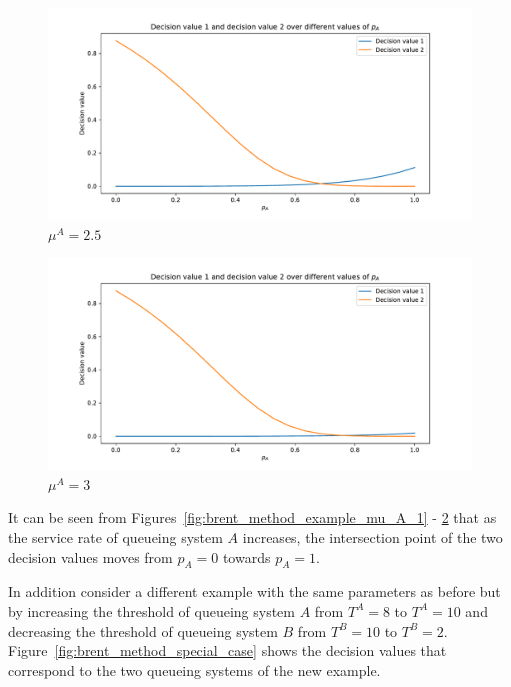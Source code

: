 \begin{figure}[H]
    \centering
    \includegraphics[width=\textwidth]{chapters/04_game_theoretic_model/img/brents_method/brent_method_example_mu_A_2.5.pdf}
    \caption{\(\mu^A = 2.5\)}
    \label{fig:brent_method_example_mu_A_4}
\end{figure}

\begin{figure}[H]
    \centering
    \includegraphics[width=\textwidth]{chapters/04_game_theoretic_model/img/brents_method/brent_method_example_mu_A_3.0.pdf}
    \caption{\(\mu^A = 3\)}
    \label{fig:brent_method_example_mu_A_5}
\end{figure}

It can be seen from Figures~\ref{fig:brent_method_example_mu_A_1} -
\ref{fig:brent_method_example_mu_A_5} that as the service rate of queueing
system \(A\) increases, the intersection point of the two decision values moves
from \(p_A=0\) towards \(p_A=1\).

In addition consider a different example with the same parameters as before
but by increasing the threshold of queueing system \(A\) from \(T^A = 8\) to
\(T^A = 10\) and decreasing the threshold of queueing system \(B\) from
\(T^B = 10\) to \(T^B = 2\).
Figure~\ref{fig:brent_method_special_case} shows the decision values that
correspond to the two queueing systems of the new example.


